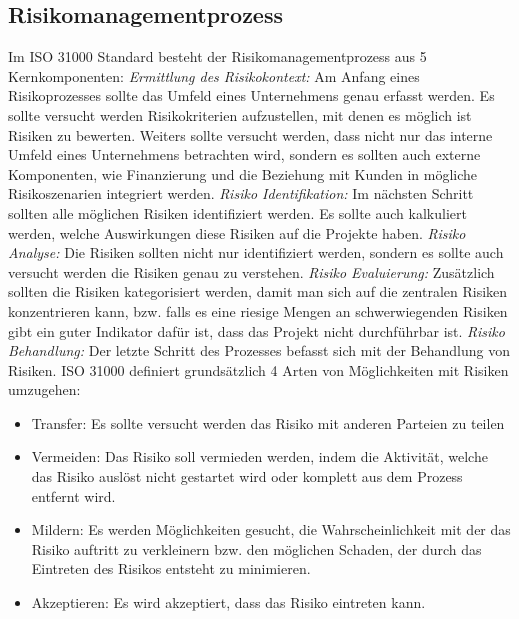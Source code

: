 \documentclass{report}
\begin{document}
\subsection{Risikomanagementprozess}
Im ISO 31000 Standard besteht der Risikomanagementprozess aus 5 Kernkomponenten: 
\newline
\newline
\emph{Ermittlung des Risikokontext:}
\newline
Am Anfang eines Risikoprozesses sollte das Umfeld eines Unternehmens genau erfasst werden. Es sollte versucht werden Risikokriterien aufzustellen, mit denen es möglich ist Risiken zu bewerten. Weiters sollte versucht werden, dass nicht nur das interne Umfeld eines Unternehmens betrachten wird, sondern es sollten auch externe Komponenten, wie Finanzierung und die Beziehung mit Kunden in mögliche Risikoszenarien integriert werden. 
\newline
\newline
\emph{Risiko Identifikation:}
\newline
Im nächsten Schritt sollten alle möglichen Risiken identifiziert werden. Es sollte auch kalkuliert werden, welche Auswirkungen diese Risiken auf die Projekte haben.  
\newline
\newline
\emph{Risiko Analyse:}
\newline
Die Risiken sollten nicht nur identifiziert werden, sondern es sollte auch versucht werden die Risiken genau zu verstehen. 
\newline
\newline
\emph{Risiko Evaluierung:}
\newline
Zusätzlich sollten die Risiken kategorisiert werden, damit man sich auf die zentralen Risiken konzentrieren kann, bzw. falls es eine riesige Mengen an schwerwiegenden Risiken gibt ein guter Indikator dafür ist, dass das Projekt nicht durchführbar ist. 
\newline
\newline
\emph{Risiko Behandlung:}
\newline
Der letzte Schritt des Prozesses befasst sich mit der Behandlung von Risiken. ISO 31000 definiert grundsätzlich 4 Arten von Möglichkeiten mit Risiken umzugehen:
\begin{itemize}
\item Transfer: Es sollte versucht werden das Risiko mit anderen Parteien zu teilen
\item Vermeiden: Das Risiko soll vermieden werden, indem die Aktivität, welche das Risiko auslöst nicht gestartet wird oder komplett aus dem Prozess entfernt wird.
\item Mildern: Es werden Möglichkeiten gesucht, die Wahrscheinlichkeit mit der das Risiko auftritt zu verkleinern bzw. den möglichen Schaden, der durch das Eintreten des Risikos entsteht zu minimieren. 
\item Akzeptieren: Es wird akzeptiert, dass das Risiko eintreten kann. 
\end{itemize}
\end{document}
